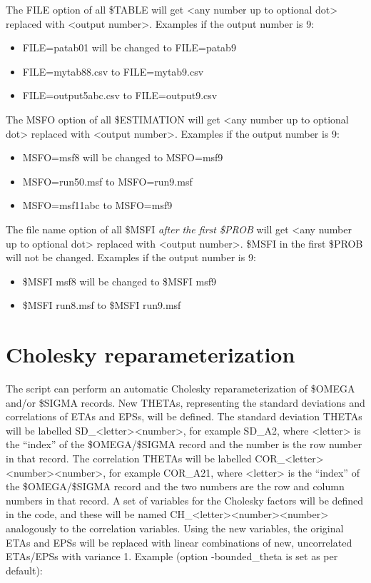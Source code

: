 The FILE option of all \$TABLE will get <any number up to optional dot> replaced with <output number>. 
Examples if the output number is 9:
\begin{itemize}
\item FILE=patab01 will be changed to FILE=patab9
\item FILE=mytab88.csv to FILE=mytab9.csv
\item FILE=output5abc.csv to FILE=output9.csv
\end{itemize}

\noindent The MSFO option of all \$ESTIMATION will get <any number up to optional dot> replaced with <output number>. 
Examples if the output number is 9:
\begin{itemize}
\item MSFO=msf8 will be changed to MSFO=msf9
\item MSFO=run50.msf to MSFO=run9.msf
\item MSFO=msf11abc to MSFO=msf9
\end{itemize}

\noindent The file name option of all \$MSFI \emph{after the first \$PROB} will get 
<any number up to optional dot> replaced with <output number>. \$MSFI in the first \$PROB
will not be changed.
Examples if the output number is 9:
\begin{itemize}
\item \$MSFI msf8 will be changed to \$MSFI msf9
\item \$MSFI run8.msf to \$MSFI run9.msf
\end{itemize}

\section{Cholesky reparameterization}
The script can perform an automatic Cholesky reparameterization of \$OMEGA and/or \$SIGMA records.
New THETAs, representing the standard deviations and correlations of ETAs and EPSs, will be
defined. The standard deviation THETAs will be labelled SD\_<letter><number>, for example SD\_A2, where <letter> 
is the ``index'' of the \$OMEGA/\$SIGMA record and the number is the row number in that record. 
The correlation THETAs will be labelled COR\_<letter><number><number>, for example COR\_A21,  where <letter> 
is the ``index'' of the \$OMEGA/\$SIGMA record and the two numbers are the row and column numbers in that record. 
A set of variables for the Cholesky factors will be defined in the code, and these will be named
CH\_<letter><number><number> analogously to the correlation variables.
Using the new variables, the original ETAs and EPSs will be replaced with linear combinations of new, uncorrelated
ETAs/EPSs with variance 1. Example (option -bounded\_theta is set as per default):

